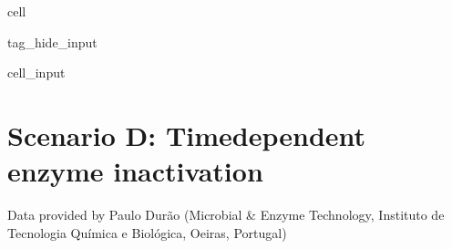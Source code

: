 \documentclass[letterpaper,12pt,english]{jupyterBook}
\begin{document}
\begin{sphinxuseclass}{cell}
\begin{sphinxuseclass}{tag_hide_input}
\begin{sphinxVerbatimInput}
\begin{sphinxuseclass}{cell_input}
\begin{sphinxVerbatim}[commandchars=\\\{\}]
      
        \PYG{p}{[} \PYG{p}{]}

      

    


      
     
\end{sphinxVerbatim}

\end{sphinxuseclass}\end{sphinxVerbatimInput}

\end{sphinxuseclass}
\end{sphinxuseclass}
\sphinxstepscope


\newpage
\section{Scenario D: Time\sphinxhyphen{}dependent enzyme inactivation}
\label{\detokenize{scenarios/enzyme_inactivation:scenario-d-br-time-dependent-enzyme-inactivation}}\label{\detokenize{scenarios/enzyme_inactivation::doc}}
\sphinxAtStartPar
Data provided by Paulo Durão (Microbial \& Enzyme Technology, Instituto de Tecnologia Química e Biológica, Oeiras, Portugal)
\end{document}

